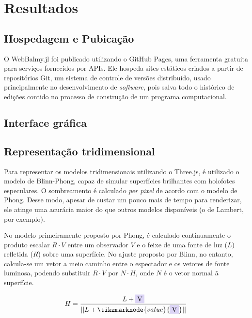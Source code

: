\chapter{Resultados}
\section{Hospedagem e Pubicação}

O WebBalmy.jl foi publicado utilizando o GitHub Pages, uma ferramenta gratuita para serviços fornecidos por APIs. Ele hospeda sites estáticos criados a partir de repositórios Git, um sistema de controle de versões distribuído, usado principalmente no desenvolvimento de \textit{software}, pois salva todo o histórico de edições contido no processo de construção de um programa computacional. 

\section{Interface gráfica}

\section{Representação tridimensional}
Para representar os modelos tridimensionais utilizando o Three.js, é utilizado o modelo de Blinn-Phong, capaz de simular superfícies brilhantes com holofotes especulares. O sombreamento é calculado \textit{per pixel} de acordo com o modelo de Phong. Desse modo, apesar de custar um pouco mais de tempo para renderizar, ele atinge uma acurácia maior do que outros modelos disponíveis (o de Lambert, por exemplo).

No modelo primeiramente proposto por Phong, é calculado continuamente o produto escalar $R \cdot V$ entre um observador $V$ e o feixe de uma fonte de luz ($L$) refletida ($R$) sobre uma superfície. No ajuste proposto por Blinn, no entanto, calcula-se um vetor a meio caminho entre o espectador e os vetores de fonte luminosa, podendo substituir $R \cdot V$ por $N \cdot H$, onde $N$ é o vetor normal ã superfície.

\begin{figure}[htb]
\begin{equation}
    \label{eq:R1}
    H = \frac{L + \highlight{blue}{V} }{||L + \tikzmarknode{value}{\highlight{blue}{V}}||}
\end{equation}
\vspace{2\baselineskip}
\end{figure}

